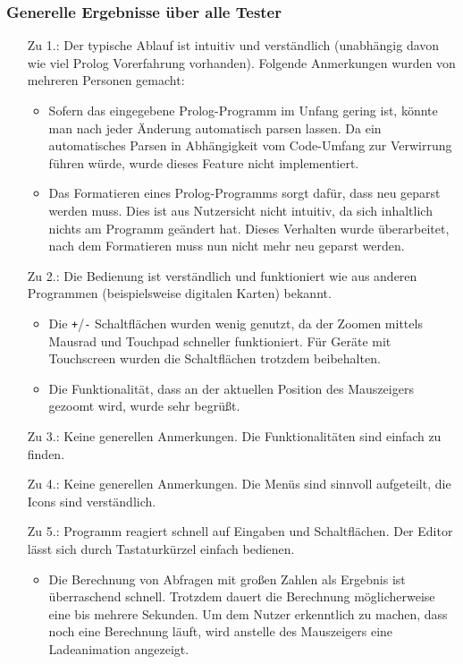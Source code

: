 \documentclass[parskip=full,11pt,twoside]{scrartcl}
\begin{document}

\subsubsection{Generelle Ergebnisse über alle Tester}

\begin{itemize}
  \item[Zu 1.:] Der typische Ablauf ist intuitiv und verständlich (unabhängig davon wie viel Prolog Vorerfahrung vorhanden). Folgende Anmerkungen wurden von mehreren Personen gemacht:
    \begin{itemize}
      \item Sofern das eingegebene Prolog-Programm im Unfang gering ist, könnte man nach jeder Änderung automatisch parsen lassen. Da ein automatisches Parsen in Abhängigkeit vom Code-Umfang zur Verwirrung führen würde, wurde dieses Feature nicht implementiert.
      \item Das Formatieren eines Prolog-Programms sorgt dafür, dass neu geparst werden muss. Dies ist aus Nutzersicht nicht intuitiv, da sich inhaltlich nichts am Programm geändert hat. Dieses Verhalten wurde überarbeitet, nach dem Formatieren muss nun nicht mehr neu geparst werden.
    \end{itemize}
  \item[Zu 2.:] Die Bedienung ist verständlich und funktioniert wie aus anderen Programmen (beispielsweise digitalen Karten) bekannt.
    \begin{itemize}
      \item Die \texttt{+}/\texttt{-} Schaltflächen wurden wenig genutzt, da der Zoomen mittels Mausrad und Touchpad schneller funktioniert. Für Geräte mit Touchscreen wurden die Schaltflächen trotzdem beibehalten.
      \item Die Funktionalität, dass an der aktuellen Position des Mauszeigers gezoomt wird, wurde sehr begrüßt.
    \end{itemize}
  \item[Zu 3.:] Keine generellen Anmerkungen. Die Funktionalitäten sind einfach zu finden.
  \item[Zu 4.:] Keine generellen Anmerkungen. Die Menüs sind sinnvoll aufgeteilt, die Icons sind verständlich.
  \item[Zu 5.:] Programm reagiert schnell auf Eingaben und Schaltflächen. Der Editor lässt sich durch Tastaturkürzel einfach bedienen.
    \begin{itemize}
      \item Die Berechnung von Abfragen mit großen Zahlen als Ergebnis ist überraschend schnell. Trotzdem dauert die Berechnung möglicherweise eine bis mehrere Sekunden. Um dem Nutzer erkenntlich zu machen, dass noch eine Berechnung läuft, wird anstelle des Mauszeigers eine Ladeanimation angezeigt.
    \end{itemize}
\end{itemize}
\end{document}
